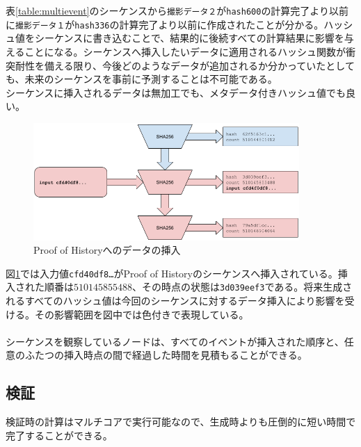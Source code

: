 \documentclass[12pt]{ltjsarticle}
\begin{document}
表\ref{table:multievent}のシーケンスから\texttt{撮影データ２}が\texttt{hash600}の計算完了より以前に\texttt{撮影データ１}が\texttt{hash336}の計算完了より以前に作成されたことが分かる。ハッシュ値をシーケンスに書き込むことで、結果的に後続すべての計算結果に影響を与えることになる。シーケンスへ挿入したいデータに適用されるハッシュ関数が衝突耐性を備える限り、今後どのようなデータが追加されるか分かっていたとしても、未来のシーケンスを事前に予測することは不可能である。\\

シーケンスに挿入されるデータは無加工でも、メタデータ付きハッシュ値でも良い。\\

\begin{figure}[h]
  \begin{center}
    \centering
    \includegraphics[width=0.9\textwidth]{../../figures/fig_3.png}
    \caption[Fig 3]{Proof of Historyへのデータの挿入\label{fig:poh_insert}}
  \end{center}
  \end{figure}

図\ref{fig:poh_insert}では入力値\texttt{cfd40df8\ldots}がProof of Historyのシーケンスへ挿入されている。挿入された順番は$510145855488$、その時点の状態は\texttt{3d039eef3}である。将来生成されるすべてのハッシュ値は今回のシーケンスに対するデータ挿入により影響を受ける。その影響範囲を図中では色付きで表現している。\\\\

シーケンスを観察しているノードは、すべてのイベントが挿入された順序と、任意のふたつの挿入時点の間で経過した時間を見積もることができる。

\subsection{検証}\label{poh:verify}
検証時の計算はマルチコアで実行可能なので、生成時よりも圧倒的に短い時間で完了することができる。\\
\end{document}
